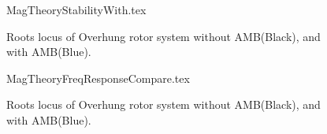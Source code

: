 \begin{figure}[!htb]
	\def\width{.6\linewidth}
	\def\height{.4\linewidth}
	\def\sep{3em}
	\centering
	{MagTheoryStabilityWith.tex}
	\caption{Roots locus of Overhung rotor system without AMB(Black), and with AMB(Blue).}
	\label{fig:MagTheoryStabilityWith}
\end{figure}
\begin{figure}[!htb]
	\def\width{.6\linewidth}
	\def\height{.4\linewidth}
	\def\sep{3em}
	\centering
	{MagTheoryFreqResponseCompare.tex}
	\caption{Roots locus of Overhung rotor system without AMB(Black), and with AMB(Blue).}
	\label{fig:MagTheoryFreqResponseCompare}
\end{figure}
